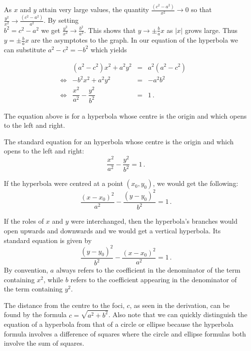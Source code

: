 As $x$ and $y$ attain very large values, the quantity $\frac{\left(c^2 - a^2\right)}{x^2} \rightarrow 0$ so that $\frac{y^2}{x^2}  \rightarrow  \frac{\left(c^2 - a^2\right)}{a^2}$.  By setting \\ $b^{2} = c^{2} - a^{2}$ we get 
$\frac{y^2}{x^2}  \rightarrow  \frac{b^2}{a^2}$.  This shows that $y \rightarrow \pm \frac{b}{a} x$ as $|x|$ grows large.  Thus $y = \pm \frac{b}{a} x$ are the asymptotes to the graph. In our equation of the hyperbola we can substitute $a^2 - c^2 = -b^2$ which yields 

\[ \begin{array}{rrclr} 
&\left(a^2 - c^2\right) x^2 +a^2 y^2 & = & a^2 \left(a^2 - c^2\right)  &\\
\Leftrightarrow&-b^2 x^2 +a^2 y^2 & = & - a^2 b^2  & \\
\Leftrightarrow&\dfrac{x^2}{a^2} - \dfrac{y^2}{b^2} & = & 1\,. & \end{array} \]

The equation above is for a hyperbola whose centre is the origin and which opens to the left and right.  
\fi

\ifvc
The standard equation for an hyperbola whose centre is the origin and which opens to the left and right:
\[\dfrac{x^2}{a^2} - \dfrac{y^2}{b^2} =  1\,. \]  
\fi


If the hyperbola were centred at a point $(x_0, y_0)$, we would get the following: 
\begin{equation}
\dfrac{(x-x_0)^2}{a^2} - \dfrac{(y-y_0)^2}{b^2} = 1\,.
\label{standardhhyperbola}
\end{equation}

If the roles of $x$ and $y$ were interchanged, then the hyperbola's branches would open upwards and downwards and we would get a vertical hyperbola. Its standard equation is given by
\begin{equation}
\dfrac{(y-y_0)^2}{b^2} - \dfrac{(x-x_0)^2}{a^2} = 1\,.
\label{standardvhyperbola}
\end{equation}
By convention, $a$ always refers to the coefficient in the denominator of the term containing $x^2$, while $b$ refers to the coefficient appearing in the denominator of the term containing $y^2$. 

The distance from the centre to the foci, $c$, as seen in the derivation, can be found by the formula $c = \sqrt{a^2 + b^2}$.  Also note that we can quickly distinguish the equation of a hyperbola from that of a circle or ellipse because the hyperbola formula involves a difference of squares where the circle and ellipse formulas both involve the sum of squares.

